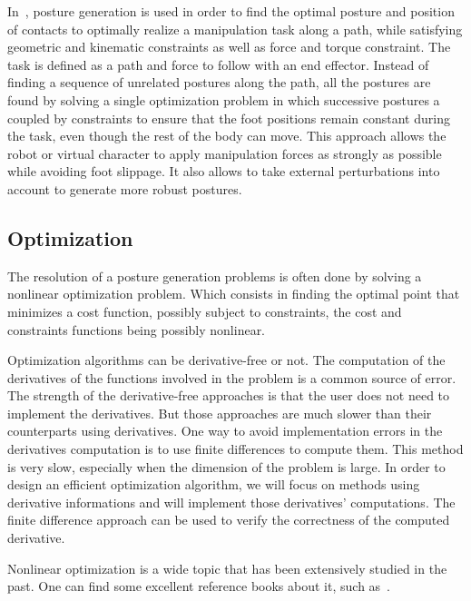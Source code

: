 In~\cite{liu:acm:2012}, posture generation is used in order to find the optimal posture and position of contacts to optimally realize a manipulation task along a path, while satisfying geometric and kinematic constraints as well as force and torque constraint.
The task is defined as a path and force to follow with an end effector.
Instead of finding a sequence of unrelated postures along the path, all the postures are found by solving a single optimization problem in which successive postures a coupled by constraints to ensure that the foot positions remain constant during the task, even though the rest of the body can move.
This approach allows the robot or virtual character to apply manipulation forces as strongly as possible while avoiding foot slippage.
It also allows to take external perturbations into account to generate more robust postures.




\subsection{Optimization}
\label{sub:optimization}

The resolution of a posture generation problems is often done by solving a nonlinear optimization problem.
Which consists in finding the optimal point that minimizes a cost function, possibly subject to constraints, the cost and constraints functions being possibly nonlinear.

Optimization algorithms can be derivative-free or not.
The computation of the derivatives of the functions involved in the problem is a common source of error.
The strength of the derivative-free approaches is that the user does not need to implement the derivatives.
But those approaches are much slower than their counterparts using derivatives.
One way to avoid implementation errors in the derivatives computation is to use finite differences to compute them.
This method is very slow, especially when the dimension of the problem is large.
In order to design an efficient optimization algorithm, we will focus on methods using derivative informations and will implement those derivatives' computations.
The finite difference approach can be used to verify the correctness of the computed derivative.

Nonlinear optimization is a wide topic that has been extensively studied in the past.
One can find some excellent reference books about it, such as~\cite{nocedal:book:2006, bonnans:book:2003, boyd2004convex}.

